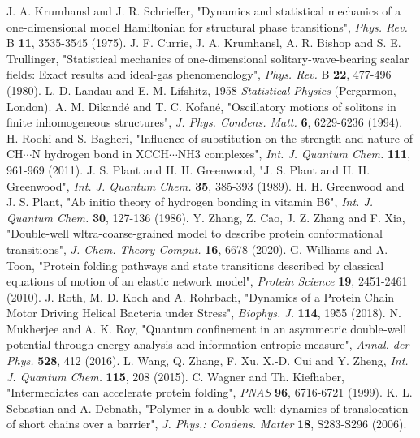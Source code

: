 \documentclass[%
 aip,
cha,
 amsmath,amssymb,
preprint,
]{revtex4-2}
\begin{document}
\begin{thebibliography}{}\label{sec:references}

J. A. Krumhansl and J. R. Schrieffer, "Dynamics and statistical mechanics of a one-dimensional model Hamiltonian for structural phase transitions", {\it Phys. Rev.} B \textbf{11}, 3535-3545 (1975).
J. F. Currie, J. A. Krumhansl, A. R. Bishop and S. E. Trullinger, "Statistical mechanics of one-dimensional solitary-wave-bearing scalar fields: Exact results and ideal-gas phenomenology", {\it Phys. Rev.} B \textbf{22}, 477-496 (1980).
L. D. Landau and E. M. Lifshitz, 1958 {\it Statistical Physics} (Pergarmon, London).
A. M. Dikand\'e and T. C. Kofan\'e, "Oscillatory motions of solitons in finite inhomogeneous structures", {\it J. Phys. Condens. Matt.} {\bf 6}, 6229-6236 (1994).
H. Roohi and S. Bagheri, "Influence of substitution on the strength and nature of CH$\cdots$N hydrogen bond in XCCH$\cdots$NH3 complexes", {\it Int. J. Quantum Chem.} {\bf 111}, 961-969 (2011).
J. S. Plant and H. H. Greenwood, "J. S. Plant and H. H. Greenwood", {\it Int. J. Quantum Chem.} {\bf 35}, 385-393 (1989).
H. H. Greenwood and J. S. Plant, "Ab initio theory of hydrogen bonding in vitamin B6", {\it Int. J. Quantum Chem.} {\bf 30}, 127-136 (1986).
Y. Zhang, Z. Cao, J. Z. Zhang and F. Xia, "Double-well wltra-coarse-grained model to describe protein conformational transitions", {\it J. Chem. Theory Comput.} {\bf 16}, 6678 (2020).
G. Williams and A. Toon, "Protein folding pathways and state transitions described by classical equations of motion of an elastic network model", {\it Protein Science} {\bf 19}, 2451-2461 (2010).
J. Roth, M. D. Koch and A. Rohrbach, "Dynamics of a Protein Chain Motor Driving Helical Bacteria under Stress", {\it Biophys. J.} {\bf 114}, 1955 (2018).
N. Mukherjee and A. K. Roy, "Quantum confinement in an asymmetric double‐well potential through energy analysis and information entropic measure", {\it Annal. der Phys.} {\bf 528}, 412 (2016).
L. Wang, Q. Zhang, F. Xu, X.-D. Cui and Y. Zheng, {\it Int. J. Quantum Chem.} {\bf 115}, 208 (2015).
C. Wagner and Th. Kiefhaber, "Intermediates can accelerate protein folding", {\it PNAS} {\bf 96}, 6716-6721 (1999).
K. L. Sebastian and A. Debnath, "Polymer in a double well: dynamics of translocation of short chains over a barrier", {\it J. Phys.: Condens. Matter} {\bf 18}, S283-S296 (2006).

\end{thebibliography}
\end{document}
